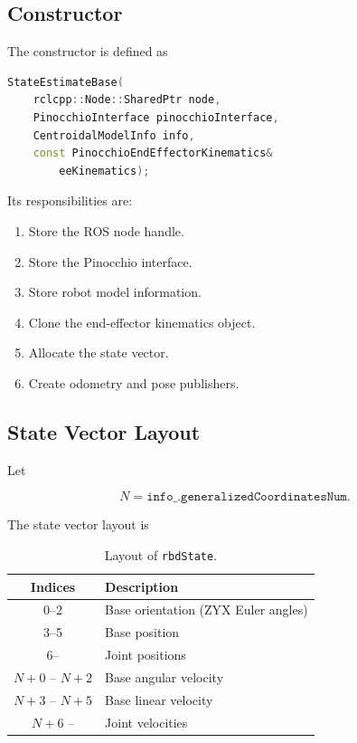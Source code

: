 \subsection{Constructor}

The constructor is defined as

\begin{lstlisting}[language=C++]
StateEstimateBase(
    rclcpp::Node::SharedPtr node,
    PinocchioInterface pinocchioInterface,
    CentroidalModelInfo info,
    const PinocchioEndEffectorKinematics&
        eeKinematics);
\end{lstlisting}

Its responsibilities are:

\begin{enumerate}
    \item Store the ROS node handle.
    \item Store the Pinocchio interface.
    \item Store robot model information.
    \item Clone the end-effector kinematics object.
    \item Allocate the state vector.
    \item Create odometry and pose publishers.
\end{enumerate}

\subsection{State Vector Layout}

Let

\begin{equation}
N = \texttt{info\_.generalizedCoordinatesNum}.
\end{equation}

The state vector layout is

\begin{table}[h]
\centering
\begin{tabular}{cl}
\hline
Indices & Description \\
\hline
0--2 & Base orientation (ZYX Euler angles) \\
3--5 & Base position \\
6-- & Joint positions \\
\hline
$N+0$ -- $N+2$ & Base angular velocity \\
$N+3$ -- $N+5$ & Base linear velocity \\
$N+6$ -- & Joint velocities \\
\hline
\end{tabular}
\caption{Layout of \texttt{rbdState}.}
\end{table}

